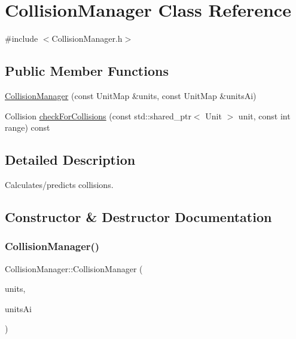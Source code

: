 \hypertarget{class_collision_manager}{}\section{Collision\+Manager Class Reference}
\label{class_collision_manager}


{\ttfamily \#include $<$Collision\+Manager.\+h$>$}

\subsection*{Public Member Functions}
\begin{DoxyCompactItemize}
\item 
\hyperlink{class_collision_manager_a1e24ab3b7447545f8f6c8fec6d21c781}{Collision\+Manager} (const Unit\+Map \&units, const Unit\+Map \&units\+Ai)
\item 
Collision \hyperlink{class_collision_manager_abb428398c7e6da1d13a68f94b7657741}{check\+For\+Collisions} (const std\+::shared\+\_\+ptr$<$ Unit $>$ unit, const int range) const
\end{DoxyCompactItemize}


\subsection{Detailed Description}
Calculates/predicts collisions. 

\subsection{Constructor \& Destructor Documentation}
\mbox{\label{class_collision_manager_a1e24ab3b7447545f8f6c8fec6d21c781}} 
\subsubsection{\texorpdfstring{Collision\+Manager()}{CollisionManager()}}
{\footnotesize\ttfamily Collision\+Manager\+::\+Collision\+Manager (\begin{DoxyParamCaption}\item[{const Unit\+Map \&}]{units,  }\item[{const Unit\+Map \&}]{units\+Ai }\end{DoxyParamCaption})}


